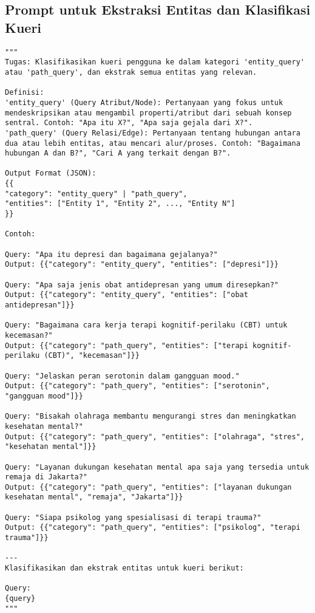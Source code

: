 \subsection{Prompt untuk Ekstraksi Entitas dan Klasifikasi Kueri}
\begin{lstlisting}[numbers=none]
"""
Tugas: Klasifikasikan kueri pengguna ke dalam kategori 'entity_query' atau 'path_query', dan ekstrak semua entitas yang relevan.

Definisi:
'entity_query' (Query Atribut/Node): Pertanyaan yang fokus untuk mendeskripsikan atau mengambil properti/atribut dari sebuah konsep sentral. Contoh: "Apa itu X?", "Apa saja gejala dari X?".
'path_query' (Query Relasi/Edge): Pertanyaan tentang hubungan antara dua atau lebih entitas, atau mencari alur/proses. Contoh: "Bagaimana hubungan A dan B?", "Cari A yang terkait dengan B?".

Output Format (JSON):
{{
"category": "entity_query" | "path_query",
"entities": ["Entity 1", "Entity 2", ..., "Entity N"]
}}

Contoh:

Query: "Apa itu depresi dan bagaimana gejalanya?"
Output: {{"category": "entity_query", "entities": ["depresi"]}}

Query: "Apa saja jenis obat antidepresan yang umum diresepkan?"
Output: {{"category": "entity_query", "entities": ["obat antidepresan"]}}

Query: "Bagaimana cara kerja terapi kognitif-perilaku (CBT) untuk kecemasan?"
Output: {{"category": "path_query", "entities": ["terapi kognitif-perilaku (CBT)", "kecemasan"]}}

Query: "Jelaskan peran serotonin dalam gangguan mood."
Output: {{"category": "path_query", "entities": ["serotonin", "gangguan mood"]}}

Query: "Bisakah olahraga membantu mengurangi stres dan meningkatkan kesehatan mental?"
Output: {{"category": "path_query", "entities": ["olahraga", "stres", "kesehatan mental"]}}

Query: "Layanan dukungan kesehatan mental apa saja yang tersedia untuk remaja di Jakarta?"
Output: {{"category": "path_query", "entities": ["layanan dukungan kesehatan mental", "remaja", "Jakarta"]}}

Query: "Siapa psikolog yang spesialisasi di terapi trauma?"
Output: {{"category": "path_query", "entities": ["psikolog", "terapi trauma"]}}

---
Klasifikasikan dan ekstrak entitas untuk kueri berikut:

Query:
{query}
"""
\end{lstlisting}


